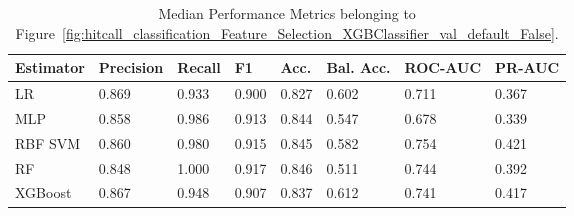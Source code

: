 \begin{longtable}{llllllll}
\caption{Median Performance Metrics belonging to Figure~\ref{fig:hitcall_classification_Feature_Selection_XGBClassifier_val_default_False}.}\label{tab:table:hitcall_classification_feature_selection_xgbclassifier_val_default_false}\\
\toprule
\midrule
\small Estimator & \small Precision & \small Recall & \small F1 & \small Acc. & \small Bal. Acc. & \small ROC-AUC & \small PR-AUC\\
\hline
LR & 0.869 & 0.933 & 0.900 & 0.827 & 0.602 & 0.711 & 0.367\\
MLP & 0.858 & 0.986 & 0.913 & 0.844 & 0.547 & 0.678 & 0.339\\
RBF SVM & 0.860 & 0.980 & 0.915 & 0.845 & 0.582 & 0.754 & 0.421\\
RF & 0.848 & 1.000 & 0.917 & 0.846 & 0.511 & 0.744 & 0.392\\
XGBoost & 0.867 & 0.948 & 0.907 & 0.837 & 0.612 & 0.741 & 0.417\\
\bottomrule
\end{longtable}